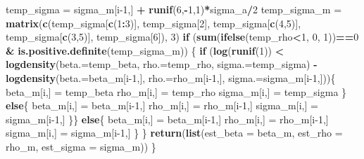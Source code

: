 \documentclass[]{article}
\newenvironment{Shaded}{\begin{snugshade}}{\end{snugshade}}
\newcommand{\ControlFlowTok}[1]{\textcolor[rgb]{0.13,0.29,0.53}{\textbf{#1}}}
\newcommand{\DataTypeTok}[1]{\textcolor[rgb]{0.13,0.29,0.53}{#1}}
\newcommand{\DecValTok}[1]{\textcolor[rgb]{0.00,0.00,0.81}{#1}}
\newcommand{\KeywordTok}[1]{\textcolor[rgb]{0.13,0.29,0.53}{\textbf{#1}}}
\newcommand{\NormalTok}[1]{#1}
\newcommand{\OperatorTok}[1]{\textcolor[rgb]{0.81,0.36,0.00}{\textbf{#1}}}
\newcommand{\StringTok}[1]{\textcolor[rgb]{0.31,0.60,0.02}{#1}}
\begin{document}
\begin{Shaded}
\begin{Highlighting}[]
\NormalTok{    temp_sigma =}\StringTok{ }\NormalTok{sigma_m[i}\DecValTok{-1}\NormalTok{,] }\OperatorTok{+}\StringTok{ }\KeywordTok{runif}\NormalTok{(}\DecValTok{6}\NormalTok{,}\OperatorTok{-}\DecValTok{1}\NormalTok{,}\DecValTok{1}\NormalTok{)}\OperatorTok{*}\NormalTok{sigma_a}\OperatorTok{/}\DecValTok{2}
\NormalTok{    temp_sigma_m =}\StringTok{ }\KeywordTok{matrix}\NormalTok{(}\KeywordTok{c}\NormalTok{(temp_sigma[}\KeywordTok{c}\NormalTok{(}\DecValTok{1}\OperatorTok{:}\DecValTok{3}\NormalTok{)], temp_sigma[}\DecValTok{2}\NormalTok{], temp_sigma[}\KeywordTok{c}\NormalTok{(}\DecValTok{4}\NormalTok{,}\DecValTok{5}\NormalTok{)], temp_sigma[}\KeywordTok{c}\NormalTok{(}\DecValTok{3}\NormalTok{,}\DecValTok{5}\NormalTok{)], temp_sigma[}\DecValTok{6}\NormalTok{]), }\DecValTok{3}\NormalTok{)}
    \ControlFlowTok{if}\NormalTok{ (}\KeywordTok{sum}\NormalTok{(}\KeywordTok{ifelse}\NormalTok{(temp_rho}\OperatorTok{<}\DecValTok{1}\NormalTok{, }\DecValTok{0}\NormalTok{, }\DecValTok{1}\NormalTok{))}\OperatorTok{==}\DecValTok{0} \OperatorTok{&}\StringTok{ }\KeywordTok{is.positive.definite}\NormalTok{(temp_sigma_m)) \{}
      \ControlFlowTok{if}\NormalTok{ (}\KeywordTok{log}\NormalTok{(}\KeywordTok{runif}\NormalTok{(}\DecValTok{1}\NormalTok{)) }\OperatorTok{<}\StringTok{ }\KeywordTok{logdensity}\NormalTok{(}\DataTypeTok{beta.=}\NormalTok{temp_beta, }\DataTypeTok{rho.=}\NormalTok{temp_rho, }\DataTypeTok{sigma.=}\NormalTok{temp_sigma) }\OperatorTok{-}\StringTok{ }\KeywordTok{logdensity}\NormalTok{(}\DataTypeTok{beta.=}\NormalTok{beta_m[i}\DecValTok{-1}\NormalTok{,], }\DataTypeTok{rho.=}\NormalTok{rho_m[i}\DecValTok{-1}\NormalTok{,], }\DataTypeTok{sigma.=}\NormalTok{sigma_m[i}\DecValTok{-1}\NormalTok{,]))\{}
\NormalTok{        beta_m[i,] =}\StringTok{ }\NormalTok{temp_beta}
\NormalTok{        rho_m[i,] =}\StringTok{ }\NormalTok{temp_rho}
\NormalTok{        sigma_m[i,] =}\StringTok{ }\NormalTok{temp_sigma}
\NormalTok{        \}}
      \ControlFlowTok{else}\NormalTok{\{}
\NormalTok{        beta_m[i,] =}\StringTok{ }\NormalTok{beta_m[i}\DecValTok{-1}\NormalTok{,]}
\NormalTok{        rho_m[i,] =}\StringTok{ }\NormalTok{rho_m[i}\DecValTok{-1}\NormalTok{,]}
\NormalTok{        sigma_m[i,] =}\StringTok{ }\NormalTok{sigma_m[i}\DecValTok{-1}\NormalTok{,]}
\NormalTok{      \}\}}
    \ControlFlowTok{else}\NormalTok{\{}
\NormalTok{      beta_m[i,] =}\StringTok{ }\NormalTok{beta_m[i}\DecValTok{-1}\NormalTok{,]}
\NormalTok{      rho_m[i,] =}\StringTok{ }\NormalTok{rho_m[i}\DecValTok{-1}\NormalTok{,]}
\NormalTok{      sigma_m[i,] =}\StringTok{ }\NormalTok{sigma_m[i}\DecValTok{-1}\NormalTok{,]}
\NormalTok{      \}}
\NormalTok{  \}}
  \KeywordTok{return}\NormalTok{(}\KeywordTok{list}\NormalTok{(}\DataTypeTok{est_beta =}\NormalTok{ beta_m, }\DataTypeTok{est_rho =}\NormalTok{ rho_m, }\DataTypeTok{est_sigma =}\NormalTok{ sigma_m))}
\NormalTok{\}}
\end{Highlighting}
\end{Shaded}
\end{document}

